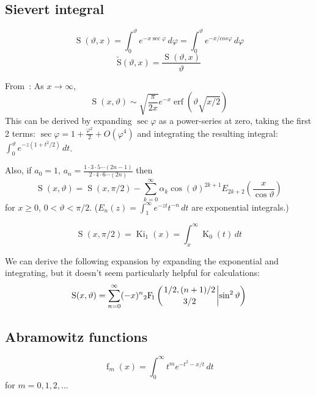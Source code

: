 \documentclass[10pt,dvipdfmx,letterpaper,twoside]{article}
\DeclareMathOperator{\erf}{erf}
\let\O=\operatorname
\newcommand{\Hyper}[5]{{\mathop{{}_{#1}\!\O{F\!}_{#2}\left({\genfrac{}{}{0pt}{}{#3}{#4}}\middle|{#5}\right)}}}
\let\al=\alpha
\let\theta=\vartheta
\let\phi=\varphi
\begin{document}
\subsection{Sievert integral}
\[ \O{S}(\theta,x) = \int_0^\theta e^{-x\sec\phi}\,d\phi = \int_0^\theta e^{-x/cos\phi}\,d\phi \]
\[ \O{\widetilde{S}}(\theta,x) = \frac{\O{S}(\theta,x)}{\theta} \]

From~\cite{a&s}:
As $x\to\infty$,
\[ \O{S}(x,\theta) \sim \sqrt{\frac{\pi}{2x}} e^{-x} \erf(\theta\sqrt{x/2}) \]
This can be derived by expanding $\sec\phi$ as a power-series at zero, taking the first 2 terms:
$\sec\phi = 1+\frac{\phi^2}{2} + O(\phi^4)$ and integrating the resulting integral:
$\int_0^\theta e^{-z(1+t^2/2)}\,dt$.

Also, if $a_0=1$, $a_n=\frac{1\cdot3\cdot5\cdots(2n-1)}{2\cdot4\cdot6\cdots(2n)}$ then
\[ \O{S}(x,\theta) = \O{S}(x,\pi/2) - \sum_{k=0}^\infty \al_k \cos(\theta)^{2k+1} E_{2k+2}(\frac{x}{\cos\theta}) \]
for $x\geq0$, $0<\theta<\pi/2$.  ($E_n(z)=\int_1^\infty e^{-zt} t^{-n}\,dt$ are exponential integrals.)

\[ \O{S}(x,\pi/2) = \O{Ki}_1(x) = \int_x^\infty \O{K}_0(t)\,dt \]

We can derive the following expansion by expanding the exponential and integrating,
but it doesn't seem particularly helpful for calculations:
\[ \O{S}(x,\theta) = \sum_{n=0}^\infty(-x)^n \Hyper{2}{1}{1/2, (n+1)/2}{3/2}{\sin^2 \theta} \]

\subsection{Abramowitz functions}
\[ \O{f}_m(x) = \int_0^\infty t^me^{-t^2-x/t}\,dt \]
for $m=0,1,2,\dots$
\end{document}

